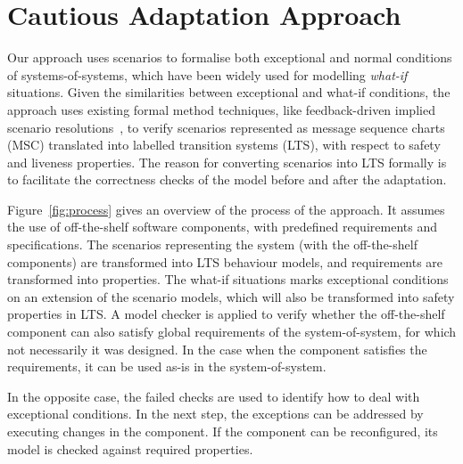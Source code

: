 \section{Cautious Adaptation Approach}


Our approach uses scenarios to formalise both exceptional and normal conditions of systems-of-systems, which have been widely used for modelling {\it what-if} situations. Given the similarities between exceptional and what-if conditions, the approach uses existing formal method techniques, like feedback-driven implied scenario resolutions~\cite{uchitel:2013}, to verify scenarios represented as message sequence charts (MSC) translated into labelled transition systems (LTS), with respect to safety and liveness properties. 
The reason for converting scenarios into LTS formally is to facilitate the correctness checks of the model before and after the adaptation.

Figure~\ref{fig:process} gives an overview of the process of the approach. It assumes the use of off-the-shelf software components, with predefined requirements and specifications. The scenarios representing the system (with the off-the-shelf components) are transformed into LTS behaviour models, and requirements are transformed into properties. The what-if situations marks exceptional conditions on an extension of the scenario models, which will also be transformed into safety properties in LTS.
A model checker is applied to verify whether the off-the-shelf component can also satisfy  global requirements of the system-of-system, for which not necessarily it was designed. In the case when the component satisfies the requirements, it can be used as-is in the system-of-system. 

In the opposite case, the failed checks are used to identify how to deal with exceptional conditions. %
In the next step, the exceptions can be addressed by executing changes in the component. If the component can be reconfigured, its model is checked against required properties. 

